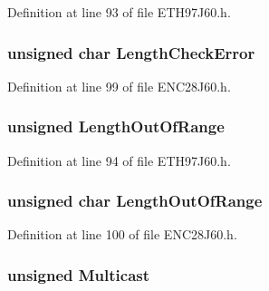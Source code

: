Definition at line 93 of file E\+T\+H97\+J60.\+h.

\hypertarget{union_r_x_s_t_a_t_u_s_a6100c4d76ea1b4110a4e6efffa431e65}{}
\subsubsection[{Length\+Check\+Error}]{\setlength{\rightskip}{0pt plus 5cm}unsigned char Length\+Check\+Error}\label{union_r_x_s_t_a_t_u_s_a6100c4d76ea1b4110a4e6efffa431e65}


Definition at line 99 of file E\+N\+C28\+J60.\+h.

\hypertarget{union_r_x_s_t_a_t_u_s_a4287a36b8a1daf1f41c7ee9a2d1fbae2}{}
\subsubsection[{Length\+Out\+Of\+Range}]{\setlength{\rightskip}{0pt plus 5cm}unsigned Length\+Out\+Of\+Range}\label{union_r_x_s_t_a_t_u_s_a4287a36b8a1daf1f41c7ee9a2d1fbae2}


Definition at line 94 of file E\+T\+H97\+J60.\+h.

\hypertarget{union_r_x_s_t_a_t_u_s_a390dd13a1eb0ef079f6dd40e0f12759e}{}
\subsubsection[{Length\+Out\+Of\+Range}]{\setlength{\rightskip}{0pt plus 5cm}unsigned char Length\+Out\+Of\+Range}\label{union_r_x_s_t_a_t_u_s_a390dd13a1eb0ef079f6dd40e0f12759e}


Definition at line 100 of file E\+N\+C28\+J60.\+h.

\hypertarget{union_r_x_s_t_a_t_u_s_a5a52ba8e63ab70f9a14871502a54fb01}{}
\subsubsection[{Multicast}]{\setlength{\rightskip}{0pt plus 5cm}unsigned Multicast}\label{union_r_x_s_t_a_t_u_s_a5a52ba8e63ab70f9a14871502a54fb01}


